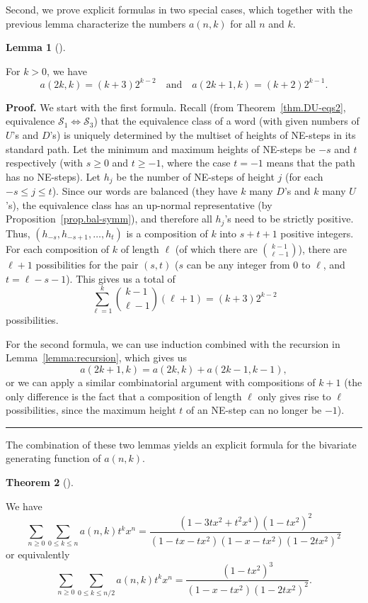 \documentclass[numbers=enddot,12pt,final,onecolumn,notitlepage]{scrartcl}%
\theoremstyle{definition}
\newtheorem{theo}{Theorem}[section]
\newenvironment{theorem}[1][]
{\begin{theo}[#1]\begin{leftbar}}
{\end{leftbar}\end{theo}}
\newtheorem{lem}[theo]{Lemma}
\newenvironment{lemma}[1][]
{\begin{lem}[#1]\begin{leftbar}}
{\end{leftbar}\end{lem}}
\newenvironment{proof}[1][Proof]{\noindent\textbf{#1.} }{\ \rule{0.5em}{0.5em}}
\newcommand{\tup}[1]{\left( #1 \right)}
\begin{document}
Second, we prove explicit formulas in two special cases, which together with the previous lemma characterize the numbers $a(n,k)$ for all $n$ and $k$.

\begin{lemma}
\label{lemma:explicit}
For $k > 0$, we have
\[ a(2k, k) = (k + 3)2^{k-2} \quad\text{and}\quad a(2k + 1, k) = (k + 2)2^{k-1}.\]
\end{lemma}

\begin{proof}
We start with the first formula.
Recall (from Theorem~\ref{thm.DU-eqs2}, equivalence $\mathcal{S}_1 \Longleftrightarrow \mathcal{S}_3$) that the equivalence class of a word (with given numbers of $U$'s and $D$'s) is uniquely determined by the multiset of heights of NE-steps in its standard path.
Let the minimum and maximum heights of NE-steps be $-s$ and $t$ respectively (with $s \geq 0$ and $t \geq -1$, where the case $t = -1$ means that the path has no NE-steps).
Let $h_j$ be the number of NE-steps of height $j$ (for each $-s \leq j \leq t$).
Since our words are balanced (they have $k$ many $D$'s and $k$ many $U$'s), the equivalence class has an up-normal representative (by Proposition~\ref{prop.bal-symm}), and therefore all $h_j$'s need to be strictly positive.
Thus, $\tup{h_{-s}, h_{-s+1}, \ldots, h_t}$ is a composition of $k$ into $s+t+1$ positive integers. For each composition of $k$ of length $\ell$ (of which there are $\binom{k-1}{\ell-1}$), there are $\ell+1$ possibilities for the pair $(s,t)$ ($s$ can be any integer from $0$ to $\ell$, and $t = \ell-s-1$). This gives us a total of
\[
\sum_{\ell=1}^k \binom{k-1}{\ell-1} (\ell+1) = (k+3)2^{k-2}
\]
possibilities.

For the second formula, we can use induction combined with the recursion in Lemma~\ref{lemma:recursion}, which gives us
\[a(2k+1,k) = a(2k,k) + a(2k-1,k-1),\]
or we can apply a similar combinatorial argument with compositions of $k+1$ (the only difference is the fact that a composition of length $\ell$ only gives rise to $\ell$ possibilities, since the maximum height $t$ of an NE-step can no longer be $-1$).
\end{proof}

The combination of these two lemmas yields an explicit formula for the bivariate generating function of $a(n,k)$.

\begin{theorem}
\label{thm:generatingfunction}
We have
\begin{equation}\label{eq:firstgf}
\sum_{n \geq 0} \sum_{0 \leq k \leq n} a(n,k)t^k x^n = \frac{(1-3tx^2+t^2x^4)(1-tx^2)^2}{(1-tx-tx^2)(1-x-tx^2)(1-2tx^2)^2}
\end{equation}
or equivalently
\begin{equation}\label{eq:secondgf}
\sum_{n \geq 0} \sum_{0 \leq k \leq n/2} a(n,k)t^k x^n = \frac{(1-tx^2)^3}{(1-x-tx^2)(1-2tx^2)^2}.
\end{equation}
\end{theorem}
\end{document}

